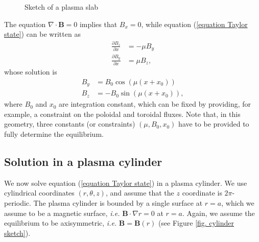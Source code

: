 \documentclass[my_thesis.tex]{subfiles}
\begin{document}
\begin{figure}
	\centering
	\caption{Sketch of a plasma slab}
	\label{fig. plasma slab}
\end{figure}

The equation $\nabla\cdot\mathbf{B}=0$ implies that $B_x=0$, while equation (\ref{equation Taylor state}) can be written as
\begin{align}
	\frac{\partial B_z}{\partial x} &= -\mu B_y\\
	\frac{\partial B_y}{\partial x} &= \mu B_z,
\end{align}
whose solution is
\begin{align}
	B_y &= B_0 \cos(\mu (x + x_0))\\
	B_z &= -B_0 \sin(\mu (x + x_0)),
\end{align}
where $B_0$ and $x_0$ are integration constant, which can be fixed by providing, for example, a constraint on the poloidal and toroidal fluxes. Note that, in this geometry, three constants (or constraints) $(\mu,B_0,x_0)$ have to be provided to fully determine the equilibrium.

\subsection{Solution in a plasma cylinder}
We now solve equation (\ref{equation Taylor state}) in a plasma cylinder. We use cylindrical coordinates $(r,\theta,z)$, and assume that the $z$ coordinate is $2\pi$-periodic. The plasma cylinder is bounded by a single surface at $r=a$, which we assume to be a magnetic surface,  \textit{i.e.} $\mathbf{B}\cdot\nabla r=0$ at $r=a$. Again, we assume the equilibrium to be axisymmetric, \textit{i.e.} $\mathbf{B}=\mathbf{B}(r)$ (see Figure \ref{fig. cylinder sketch}).
\end{document}
